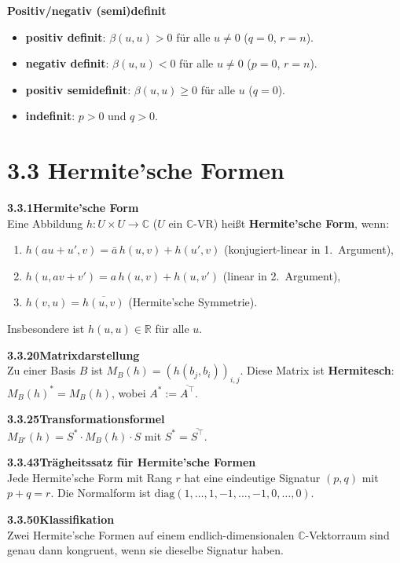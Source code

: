 \documentclass[a4paper,12pt]{article}
\newcommand{\gentry}[3]{%
  \noindent\textbf{#1\quad #2}\nopagebreak\\[0.2em]
  #3\par\smallskip
}
\begin{document}
\gentry{}{Positiv/negativ (semi)definit}{%
  \begin{itemize}[topsep=2pt,itemsep=1pt]
    \item \textbf{positiv definit}: $\beta(u,u) > 0$ für alle $u \neq 0$ ($q = 0$, $r = n$).
    \item \textbf{negativ definit}: $\beta(u,u) < 0$ für alle $u \neq 0$ ($p = 0$, $r = n$).
    \item \textbf{positiv semidefinit}: $\beta(u,u) \geq 0$ für alle $u$ ($q = 0$).
    \item \textbf{indefinit}: $p > 0$ und $q > 0$.
  \end{itemize}
}

\section*{3.3 \quad Hermite'sche Formen}

\gentry{3.3.1}{Hermite'sche Form}{%
  Eine Abbildung $h: U \times U \to \mathbb{C}$ ($U$ ein $\mathbb{C}$-VR) heißt \textbf{Hermite'sche Form}, wenn:
  \begin{enumerate}[label=(\alph*), topsep=2pt, itemsep=1pt]
    \item $h(au + u', v) = \bar{a}\, h(u,v) + h(u',v)$ (konjugiert-linear in 1.\ Argument),
    \item $h(u, av + v') = a\, h(u,v) + h(u,v')$ (linear in 2.\ Argument),
    \item $h(v,u) = \overline{h(u,v)}$ (Hermite'sche Symmetrie).
  \end{enumerate}
  Insbesondere ist $h(u,u) \in \mathbb{R}$ für alle $u$.
}

\gentry{3.3.20}{Matrixdarstellung}{%
  Zu einer Basis $B$ ist $M_B(h) = (h(b_j, b_i))_{i,j}$. Diese Matrix ist \textbf{Hermitesch}: $M_B(h)^* = M_B(h)$, wobei $A^* := \overline{A^\top}$.
}

\gentry{3.3.25}{Transformationsformel}{%
  $M_{B'}(h) = S^* \cdot M_B(h) \cdot S$ mit $S^* = \overline{S^\top}$.
}

\gentry{3.3.43}{Trägheitssatz für Hermite'sche Formen}{%
  Jede Hermite'sche Form mit Rang $r$ hat eine eindeutige Signatur $(p,q)$ mit $p+q=r$. Die Normalform ist $\mathrm{diag}(1,\ldots,1,-1,\ldots,-1,0,\ldots,0)$.
}

\gentry{3.3.50}{Klassifikation}{%
  Zwei Hermite'sche Formen auf einem endlich-dimensionalen $\mathbb{C}$-Vektorraum sind genau dann kongruent, wenn sie dieselbe Signatur haben.
}
\end{document}
